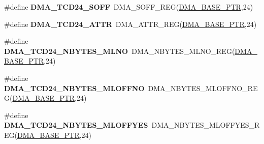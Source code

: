 \begin{DoxyCompactItemize}
\item 
\hypertarget{group___d_m_a___register___accessor___macros_ga855d7ca1b073ab58a1f4538099787bca}{}\#define {\bfseries D\+M\+A\+\_\+\+T\+C\+D24\+\_\+\+S\+O\+F\+F}~D\+M\+A\+\_\+\+S\+O\+F\+F\+\_\+\+R\+E\+G(\hyperlink{group___d_m_a___peripheral_ga6997fbc1b1973e9f27170217a3bd6f22}{D\+M\+A\+\_\+\+B\+A\+S\+E\+\_\+\+P\+T\+R},24)\label{group___d_m_a___register___accessor___macros_ga855d7ca1b073ab58a1f4538099787bca}

\item 
\hypertarget{group___d_m_a___register___accessor___macros_gafc4eccef8dc19eefb3d3371105a8e3b0}{}\#define {\bfseries D\+M\+A\+\_\+\+T\+C\+D24\+\_\+\+A\+T\+T\+R}~D\+M\+A\+\_\+\+A\+T\+T\+R\+\_\+\+R\+E\+G(\hyperlink{group___d_m_a___peripheral_ga6997fbc1b1973e9f27170217a3bd6f22}{D\+M\+A\+\_\+\+B\+A\+S\+E\+\_\+\+P\+T\+R},24)\label{group___d_m_a___register___accessor___macros_gafc4eccef8dc19eefb3d3371105a8e3b0}

\item 
\hypertarget{group___d_m_a___register___accessor___macros_ga88ab11605b10b8c959f11d71e142d26f}{}\#define {\bfseries D\+M\+A\+\_\+\+T\+C\+D24\+\_\+\+N\+B\+Y\+T\+E\+S\+\_\+\+M\+L\+N\+O}~D\+M\+A\+\_\+\+N\+B\+Y\+T\+E\+S\+\_\+\+M\+L\+N\+O\+\_\+\+R\+E\+G(\hyperlink{group___d_m_a___peripheral_ga6997fbc1b1973e9f27170217a3bd6f22}{D\+M\+A\+\_\+\+B\+A\+S\+E\+\_\+\+P\+T\+R},24)\label{group___d_m_a___register___accessor___macros_ga88ab11605b10b8c959f11d71e142d26f}

\item 
\hypertarget{group___d_m_a___register___accessor___macros_gac9c61ea4a5395017cfcffda7efdc7019}{}\#define {\bfseries D\+M\+A\+\_\+\+T\+C\+D24\+\_\+\+N\+B\+Y\+T\+E\+S\+\_\+\+M\+L\+O\+F\+F\+N\+O}~D\+M\+A\+\_\+\+N\+B\+Y\+T\+E\+S\+\_\+\+M\+L\+O\+F\+F\+N\+O\+\_\+\+R\+E\+G(\hyperlink{group___d_m_a___peripheral_ga6997fbc1b1973e9f27170217a3bd6f22}{D\+M\+A\+\_\+\+B\+A\+S\+E\+\_\+\+P\+T\+R},24)\label{group___d_m_a___register___accessor___macros_gac9c61ea4a5395017cfcffda7efdc7019}

\item 
\hypertarget{group___d_m_a___register___accessor___macros_ga9f8324a6bfeb33212ffdfd39cf6c209c}{}\#define {\bfseries D\+M\+A\+\_\+\+T\+C\+D24\+\_\+\+N\+B\+Y\+T\+E\+S\+\_\+\+M\+L\+O\+F\+F\+Y\+E\+S}~D\+M\+A\+\_\+\+N\+B\+Y\+T\+E\+S\+\_\+\+M\+L\+O\+F\+F\+Y\+E\+S\+\_\+\+R\+E\+G(\hyperlink{group___d_m_a___peripheral_ga6997fbc1b1973e9f27170217a3bd6f22}{D\+M\+A\+\_\+\+B\+A\+S\+E\+\_\+\+P\+T\+R},24)\label{group___d_m_a___register___accessor___macros_ga9f8324a6bfeb33212ffdfd39cf6c209c}


\end{DoxyCompactItemize}
